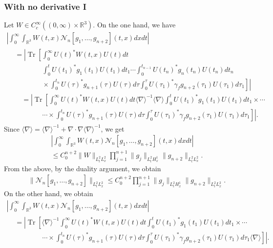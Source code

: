 \documentclass[AHL,Unicode,longabstracts,MathTools,published]{cedram}
\newcommand{\BR}{\mathbb{R}}
\newcommand{\CN}{\mathcal{N}}
\newcommand{\ga}{\gamma}
\newcommand{\ta}{\tau}
\newcommand{\abs}[1]{\left|#1\right|}
\newcommand{\I}{\infty}
\DeclareMathOperator{\Tr}{Tr}
\newcommand{\sd}{\langle \nabla \rangle}
\newcommand{\sdi}{\sd^{-1}}
\newcommand{\R}{\mathbb{R}}
\newcommand{\na}{\nabla}
\begin{document}
\subsubsection{With no derivative I}

Let $W \in C_c^\I((0,\I) \times \BR^3)$. On the one hand, we have
\begin{multline}
\abs{\int_0^\I \int_{\R^3} W(t,x) \CN_n[g_1,\dots,g_{n+2}](t,x) dx dt } \\
\begin{aligned}
& = \left| \Tr \left[\int_0^\I U(t)^* W(t,x) U(t) dt
\right. \right.\\
&\qquad \qquad\int_0^t U(t_1)^* g_1(t_1) U(t_1)dt_1
\cdots
\int_0^{t_{n-1}} U(t_n)^* g_n(t_n) U(t_n)dt_n
\\
&\left. \left. \qquad \qquad \times
\int_0^{t_n} U(\ta)^* g_{n+1}(\ta) U(\ta)d\ta
\int_0^\ta U(\ta_1)^* \ga_f g_{n+2}(\ta_1) U(\ta_1)d\ta_1 \right] \right| \\
&\quad = \left| \Tr \left[\int_0^\I U(t)^* W(t,x) U(t) dt \sdi
\sd \int_0^t U(t_1)^* g_1(t_1) U(t_1)dt_1
\times
\cdots
\right. \right. \\
&\left. \left. \qquad \qquad \cdots \times
\int_0^{t_n} U(\ta)^* g_{n+1}(\ta) U(\ta)d\ta
\int_0^\ta U(\ta_1)^* \ga_f g_{n+2}(\ta_1) U(\ta_1)d\ta_1 \right] \right|.
\end{aligned}
\end{multline}
Since $\sd = \sdi + \na \cdot \na \sdi$, we get
\begin{multline}
\abs{\int_0^\I \int_{\R^3} W(t,x) \CN_n[g_1,\dots,g_{n+2}](t,x) dx dt }\\
\le C_0^{n+2} \|W\|_{L^2_t L^2_x} \prod_{j=1}^{n+1}\|g_j\|_{L^2_t H^1_x} \|g_{n+2}\|_{L^2_t L^2_x}.
\end{multline}
From the above, by the duality argument, we obtain
\begin{align}\label{eq:inter. g}
\|\CN_n[g_1,\dots,g_{n+2}]\|_{L^2_t L^2_x} \le C_0^{n+2} \prod_{j=1}^{n+1}\|g_j\|_{L^2_t H^1_x} \|g_{n+2}\|_{L^2_t L^2_x}.
\end{align}
On the other hand, we obtain
\begin{multline}
\abs{\int_0^\I \int_{\R^3} W(t,x) \CN_n[g_1,\dots,g_{n+2}](t,x) dx dt } \\
\begin{aligned}
&= \left| \Tr \left[\sdi \int_0^\I U(t)^* W(t,x) U(t) dt \int_0^t U(t_1)^* g_1(t_1) U(t_1)dt_1
\times
\cdots
\right. \right. \\
&\left. \left. \qquad \qquad \cdots \times
\int_0^{t_n} U(\ta)^* g_{n+1}(\ta) U(\ta)d\ta
\int_0^\ta U(\ta_1)^* \ga_f g_{n+2}(\ta_1) U(\ta_1)d\ta_1 \sd \right] \right|.
\end{aligned}
\end{multline}
\end{document}
